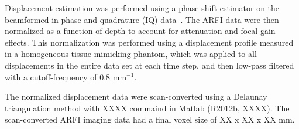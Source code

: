 

Displacement estimation was performed using a phase-shift estimator on the
beamformed in-phase and quadrature (IQ) data~\cite{Loupas95,pinton06}. The ARFI
data were then normalized as a function of depth to account for attenuation and
focal gain effects.  This normalization was performed using a displacement
profile measured in a homogeneous tissue-mimicking phantom, which was applied
to all displacements in the entire data set at each time step, and then
low-pass filtered with a cutoff-frequency of 0.8 mm$^{-1}$.

The normalized displacement data were scan-converted using a Delaunay
triangulation method with XXXX commaind in Matlab (R2012b, XXXX).  The
scan-converted ARFI imaging data had a final voxel size of XX x XX x XX mm.
